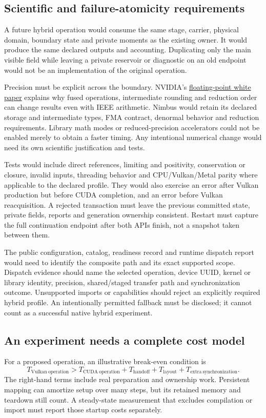 \subsection{Scientific and failure-atomicity requirements}
A future hybrid operation would consume the same stage, carrier, physical domain,
boundary state and private moments as the existing owner. It would produce the
same declared outputs and accounting. Duplicating only the main visible field
while leaving a private reservoir or diagnostic on an old endpoint would not
be an implementation of the original operation.

Precision must be explicit across the boundary. NVIDIA's
\href{https://docs.nvidia.com/cuda/floating-point/index.html}{floating-point
white paper} explains why fused operations, intermediate rounding and reduction
order can change results even with IEEE arithmetic. Nimbus would retain its
declared storage and intermediate types, FMA contract, denormal behavior and
reduction requirements. Library math modes or reduced-precision accelerators
could not be enabled merely to obtain a faster timing. Any intentional numerical
change would need its own scientific justification and tests.

Tests would include direct references, limiting and positivity, conservation or
closure, invalid inputs, threading behavior and CPU/Vulkan/Metal parity where
applicable to the declared profile. They would also exercise an error after
Vulkan production but before CUDA completion, and an error before Vulkan
reacquisition. A rejected transaction must leave the previous committed state,
private fields, reports and generation ownership consistent. Restart must
capture the full continuation endpoint after both APIs finish, not a snapshot
taken between them.

The public configuration, catalog, readiness record and runtime dispatch report
would need to identify the composite path and its exact supported scope.
Dispatch evidence should name the selected operation, device UUID, kernel or
library identity, precision, shared/staged transfer path and synchronization
outcome. Unsupported imports or capabilities should reject an explicitly
required hybrid profile. An intentionally permitted fallback must be disclosed;
it cannot count as a successful native hybrid experiment.

\subsection{An experiment needs a complete cost model}
For a proposed operation, an illustrative break-even condition is
\begin{equation}
 T_{\mathrm{Vulkan\ operation}} >
 T_{\mathrm{CUDA\ operation}}+T_{\mathrm{handoff}}+
 T_{\mathrm{layout}}+T_{\mathrm{extra\ synchronization}}.
\end{equation}
The right-hand terms include real preparation and ownership work. Persistent
mapping can amortize setup over many steps, but its retained memory and teardown
still count. A steady-state measurement that excludes compilation or import
must report those startup costs separately.

